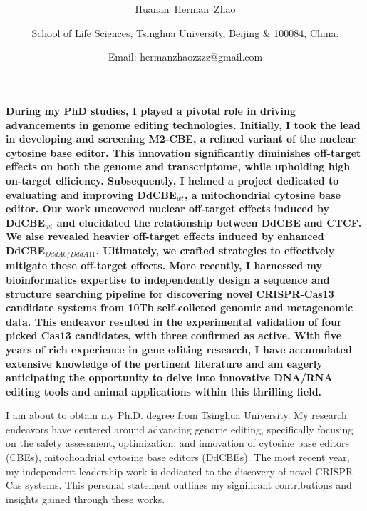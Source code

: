 \documentclass[12pt]{article}
\date{}
\title{\bfseries \boldmath \scititle}
\author{
	Huanan~Herman~Zhao\and
	\small School of Life Sciences, Tsinghua University, Beijing \& 100084, China.\and
	\small \hspace{3em} Email: hermanzhaozzzz@gmail.com\and
}
\renewenvironment{abstract}
	{\quotation}
	{\endquotation}
\begin{document}
 

\maketitle

\begin{abstract} \bfseries \boldmath
    During my PhD studies, I played a pivotal role in driving advancements in genome editing technologies.
    Initially, I took the lead in developing and screening M2-CBE, 
    a refined variant of the nuclear cytosine base editor.
    This innovation significantly diminishes off-target effects on both the genome and transcriptome, 
    while upholding high on-target efficiency.
    Subsequently, I helmed a project dedicated to evaluating and improving DdCBE$_{wt}$, 
    a mitochondrial cytosine base editor. 
    Our work uncovered nuclear off-target effects induced by DdCBE$_{wt}$ and elucidated the relationship between DdCBE and CTCF.
    We alse revealed heavier off-target effects induced by enhanced DdCBE$_{DddA6/DddA11}$.
    Ultimately, we crafted strategies to effectively mitigate these off-target effects.
    More recently, I harnessed my bioinformatics expertise to independently design a sequence and structure 
    searching pipeline for discovering novel CRISPR-Cas13 candidate systems from 10Tb self-colleted genomic and metagenomic data. 
    This endeavor resulted in the experimental validation of four picked Cas13 candidates, with three confirmed as active.
    With five years of rich experience in gene editing research, 
    I have accumulated extensive knowledge of the pertinent literature and am eagerly anticipating the opportunity 
    to delve into innovative DNA/RNA editing tools and animal applications within this thrilling field.
\end{abstract}



\noindent
I am about to obtain my Ph.D. degree from Tsinghua University.
My research endeavors have centered around advancing genome editing, 
specifically focusing on the safety assessment, optimization, 
and innovation of cytosine base editors (CBEs), mitochondrial cytosine base editors (DdCBEs).
The most recent year, my independent leadership work is dedicated to the discovery of novel CRISPR-Cas systems. 
This personal statement outlines my significant contributions and insights gained through these works.  
\end{document}
